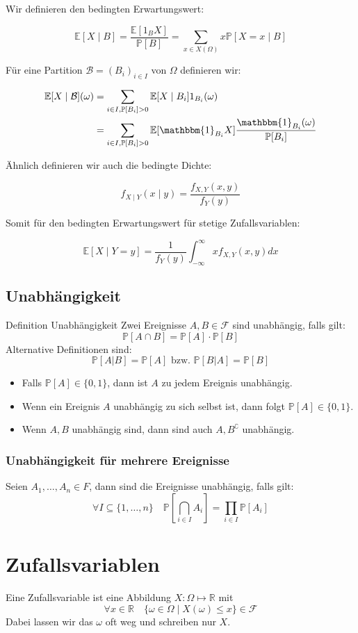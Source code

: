 \documentclass[a4paper,10pt]{article}
\def\R{\mathbb{R}}
\def\P{\mathbb{P}}
\def\F{\mathcal{F}}
\def\E{\mathbb{E}}
\begin{document}
Wir definieren den bedingten Erwartungswert:

$$
	\E[X \mid B] = \frac{\E[1_B X]}{\P[B]} = \sum_{x \in X(\Omega)} x \P[X = x \mid B]
$$

Für eine Partition $\mathcal{B} = (B_i)_{i \in I}$ von $\Omega$ definieren wir:

\begin{align*}
	\E[X \mid \mathcal{B}](\omega) & = \sum_{i \in I, \P[B_i] > 0} \E[X \mid B_i] 1_{B_i}(\omega)\\ 
	& = \sum_{i \in I, \P[B_i] > 0} \E[\mathbbm{1}_{B_i} X] \frac{\mathbbm{1}_{B_i}(\omega)}{\P[B_i]}
\end{align*}

Ähnlich definieren wir auch die bedingte Dichte:

$$
	f_{X \mid Y}(x \mid y) = \frac{f_{X,Y}(x,y)}{f_Y(y)}
$$

Somit für den bedingten Erwartungswert für stetige Zufallsvariablen:

$$
	\E[X \mid Y = y] = \frac{1}{f_Y(y)} \int_{-\infty}^\infty x f_{X,Y}(x,y) dx
$$

\subsection{Unabhängigkeit}
\begin{mainbox}{Definition Unabhängigkeit}
	Zwei Ereignisse \(A, B\in \F\) sind unabhängig, falls gilt:
	\[\P[A\cap B] = \P[A] \cdot \P[B]\]
	Alternative Definitionen sind:
	\[\P[A|B] = \P[A] \text{ bzw. } \P[B|A] = \P[B]\]
\end{mainbox}
\begin{itemize}
	\item Falls \(\P[A] \in \{0,1\}\), dann ist \(A\) zu jedem Ereignis unabhängig.
	\item Wenn ein Ereignis \(A\) unabhängig zu sich selbst ist, dann folgt \(\P[A] \in \{0,1\}\).
	\item Wenn \(A, B\) unabhängig sind, dann sind auch \(A, B^\complement\) unabhängig.
\end{itemize}
\subsubsection*{Unabhängigkeit für mehrere Ereignisse}
Seien \(A_1, \ldots, A_n \in F\), dann sind die Ereignisse unabhängig, falls gilt:
\[\forall I \subseteq \{1, \ldots, n\} \quad \P \left[ \bigcap_{i\in I}A_i \right] = \prod_{i\in I} \P[A_i]\]

\section{Zufallsvariablen}
Eine Zufallsvariable ist eine Abbildung \(X: \Omega \mapsto \R\) mit
\[\forall x \in \R \quad \{\omega \in \Omega \mid X(\omega) \leq x\} \in \F\]
Dabei lassen wir das \(\omega\) oft weg und schreiben nur \(X\).
\end{document}
